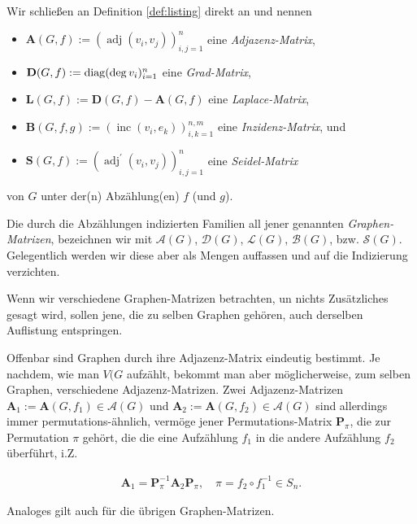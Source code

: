 \begin{definition}

    Wir schließen an Definition \ref{def:listing} direkt an und nennen

    \begin{itemize}
        \item $\mathbf A(G, f) := (\operatorname{adj}(v_i, v_j))_{i, j = 1}^n$ eine \textit{Adjazenz-Matrix},
        \item $\mathbf D(G, f) := \operatorname{diag} (\deg v_i)_{i=1}^n$ eine \textit{Grad-Matrix},
        \item $\mathbf L(G, f) := \mathbf D(G, f) - \mathbf A(G, f)$ eine \textit{Laplace-Matrix},
        \item $\mathbf B(G, f, g) := (\operatorname{inc}(v_i, e_k))_{i, k = 1}^{n, m}$ eine \textit{Inzidenz-Matrix}, und
        \item $\mathbf S(G, f) := (\operatorname{adj}^\prime(v_i, v_j))_{i, j = 1}^n$ eine \textit{Seidel-Matrix}
    \end{itemize}

    von $G$ unter der(n) Abzählung(en) $f$ (und $g$).

    Die durch die Abzählungen indizierten Familien all jener genannten \textit{Graphen-Matrizen}, bezeichnen wir mit $\mathcal A(G)$, $\mathcal D(G)$, $\mathcal L(G)$, $\mathcal B(G)$, bzw. $\mathcal S(G)$.
    Gelegentlich werden wir diese aber als Mengen auffassen und auf die Indizierung verzichten.

\end{definition}

Wenn wir verschiedene Graphen-Matrizen betrachten, un nichts Zusätzliches gesagt wird, sollen jene, die zu selben Graphen gehören, auch derselben Auflistung entspringen.

\begin{remark}

    Offenbar sind Graphen durch ihre Adjazenz-Matrix eindeutig bestimmt.
    Je nachdem, wie man $V(G$ aufzählt, bekommt man aber möglicherweise, zum selben Graphen, verschiedene Adjazenz-Matrizen.
    Zwei Adjazenz-Matrizen $\mathbf A_1 := \mathbf A(G, f_1) \in \mathcal A(G)$ und $\mathbf A_2 :=  \mathbf A(G, f_2) \in \mathcal A(G)$ sind allerdings immer permutations-ähnlich, vermöge jener Permutations-Matrix $\mathbf P_\pi$, die zur Permutation $\pi$ gehört, die die eine Aufzählung $f_1$ in die andere Aufzählung $f_2$ überführt, i.Z.

    \begin{align*}
        \mathbf A_1 = \mathbf P_\pi^{-1} \mathbf A_2 \mathbf P_\pi,
        \quad
        \pi = f_2 \circ f_1^{-1} \in S_n.
    \end{align*}

    Analoges gilt auch für die übrigen Graphen-Matrizen.

\end{remark}

